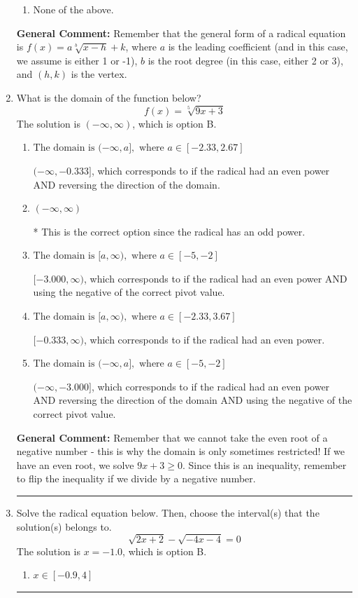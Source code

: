 \documentclass{extbook}[14pt]
\newcommand{\litem}[1]{\item #1

\rule{\textwidth}{0.4pt}}
\begin{document}
\begin{enumerate}
{\begin{enumerate}[label=\Alph*.]
\begin{multicols}{2}
\end{multicols}\item None of the above.\end{enumerate}
\textbf{General Comment:} Remember that the general form of a radical equation is $ f(x) = a \sqrt[b]{x - h} + k $, where $a$ is the leading coefficient (and in this case, we assume is either 1 or -1), $b$ is the root degree (in this case, either 2 or 3), and $(h, k)$ is the vertex.
}
\litem{
What is the domain of the function below?
\[ f(x) = \sqrt[5]{9 x + 3} \]The solution is \( (-\infty, \infty) \), which is option B.\begin{enumerate}[label=\Alph*.]
\item \( \text{The domain is } (-\infty, a], \text{   where } a \in [-2.33, 2.67] \)

$(-\infty, -0.333]$, which corresponds to if the radical had an even power AND reversing the direction of the domain.
\item \( (-\infty, \infty) \)

* This is the correct option since the radical has an odd power.
\item \( \text{The domain is } [a, \infty), \text{   where } a \in [-5, -2] \)

$[-3.000, \infty)$, which corresponds to if the radical had an even power AND using the negative of the correct pivot value.
\item \( \text{The domain is } [a, \infty), \text{   where } a \in [-2.33, 3.67] \)

$[-0.333, \infty)$, which corresponds to if the radical had an even power.
\item \( \text{The domain is } (-\infty, a], \text{   where } a \in [-5, -2] \)

$(-\infty, -3.000]$, which corresponds to if the radical had an even power AND reversing the direction of the domain AND using the negative of the correct pivot value.
\end{enumerate}

\textbf{General Comment:} Remember that we cannot take the even root of a negative number - this is why the domain is only sometimes restricted! If we have an even root, we solve $9 x + 3 \geq 0$. Since this is an inequality, remember to flip the inequality if we divide by a negative number.
}
\litem{
Solve the radical equation below. Then, choose the interval(s) that the solution(s) belongs to.
\[ \sqrt{2 x + 2} - \sqrt{-4 x - 4} = 0 \]The solution is \( x = -1.0 \), which is option B.\begin{enumerate}[label=\Alph*.]
\item \( x \in [-0.9,4] \)


\end{enumerate}}
\end{enumerate}
\end{document}
